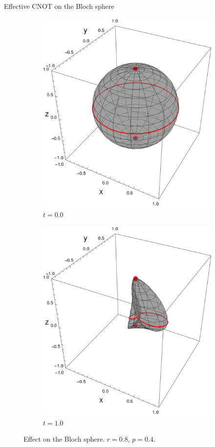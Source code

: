 \begin{frame}{Effective CNOT on the Bloch sphere}
    \begin{figure}[h!]
        \centering
        \begin{subfigure}{0.32\textwidth}
            \centering
            \includegraphics[width=0.9\linewidth]{figures/sphere_CNOT_t=0.0_z=0.8_p=0.6.png}
            \caption{$t=0.0$}
        \end{subfigure}%
        \begin{subfigure}{0.32\textwidth}
            \centering
            \includegraphics[width=0.9\linewidth]{figures/sphere_CNOT_t=1.0_z=0.8_p=0.6.png}
            \caption{$t=1.0$}
        \end{subfigure}
        \caption{Effect on the Bloch sphere. $r=0.8$, $p=0.4$.}
    \end{figure}
\end{frame}
